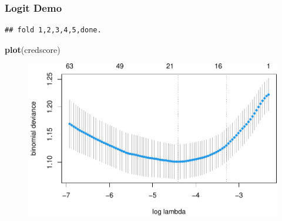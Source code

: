 \documentclass[
  shownotes,
  xcolor={svgnames},
  hyperref={colorlinks,citecolor=DarkBlue,linkcolor=DarkRed,urlcolor=DarkBlue}
  , aspectratio=169]{beamer}
\newenvironment{Shaded}{\begin{snugshade}}{\end{snugshade}}
\newcommand{\DataTypeTok}[1]{\textcolor[rgb]{0.13,0.29,0.53}{#1}}
\newcommand{\KeywordTok}[1]{\textcolor[rgb]{0.13,0.29,0.53}{\textbf{#1}}}
\newcommand{\NormalTok}[1]{#1}
\newcommand{\OperatorTok}[1]{\textcolor[rgb]{0.81,0.36,0.00}{\textbf{#1}}}
\newcommand{\OtherTok}[1]{\textcolor[rgb]{0.56,0.35,0.01}{#1}}
\newcommand{\StringTok}[1]{\textcolor[rgb]{0.31,0.60,0.02}{#1}}
\begin{document}
\begin{frame}[fragile]
\frametitle{Logit Demo}

\begin{scriptsize}
\begin{Shaded}
\end{Shaded}
\end{scriptsize}
\begin{tiny}

\begin{verbatim}
## fold 1,2,3,4,5,done.
\end{verbatim}
\end{tiny}
\begin{scriptsize}
\begin{Shaded}
\begin{Highlighting}[]
\KeywordTok{plot}\NormalTok{(credscore)}
\end{Highlighting}
\end{Shaded}
\end{scriptsize}

\begin{figure}[H] \centering
            \captionsetup{justification=centering}
              \includegraphics[scale=0.4]{figures/lambdas} 
 \end{figure}


\end{frame}
\end{document}
